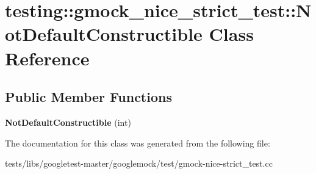 \hypertarget{classtesting_1_1gmock__nice__strict__test_1_1NotDefaultConstructible}{}\section{testing\+:\+:gmock\+\_\+nice\+\_\+strict\+\_\+test\+:\+:Not\+Default\+Constructible Class Reference}
\label{classtesting_1_1gmock__nice__strict__test_1_1NotDefaultConstructible}
\subsection*{Public Member Functions}
\begin{DoxyCompactItemize}
\item 
\mbox{\label{classtesting_1_1gmock__nice__strict__test_1_1NotDefaultConstructible_acfaca2e03925805192b698708d6030bc}} 
{\bfseries Not\+Default\+Constructible} (int)
\end{DoxyCompactItemize}


The documentation for this class was generated from the following file\+:\begin{DoxyCompactItemize}
\item 
tests/libs/googletest-\/master/googlemock/test/gmock-\/nice-\/strict\+\_\+test.\+cc\end{DoxyCompactItemize}
